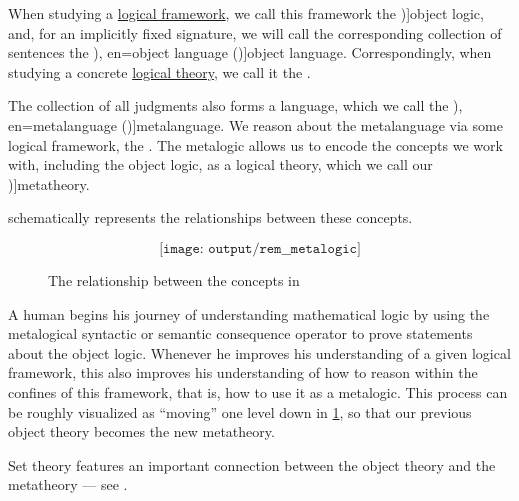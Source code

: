 \begin{concept}\label{con:metalogic}
  When studying a \hyperref[def:logical_framework]{logical framework}, we call this framework the \term[en=object logic (\cite[3]{Kleene2002Logic})]{object logic}, and, for an implicitly fixed signature, we will call the corresponding collection of sentences the \term[ru=предметный язык (\cite[35]{Герасимов2011}), en=object language (\cite[3]{Kleene2002Logic})]{object language}. Correspondingly, when studying a concrete \hyperref[def:logical_theory]{logical theory}, we call it the .

  The collection of all judgments also forms a language, which we call the \term[ru=метаязык (\cite[35]{Герасимов2011}), en=metalanguage (\cite[3]{Kleene2002Logic})]{metalanguage}. We reason about the metalanguage via some logical framework, the . The metalogic allows us to encode the concepts we work with, including the object logic, as a logical theory, which we call our \term[en=metatheory (\cite[199]{Kleene2002Logic})]{metatheory}.

   schematically represents the relationships between these concepts.

  \begin{figure}[!ht]
    \begin{equation*}
      \texttt{[image: output/rem\_\_metalogic]}
    \end{equation*}
    \caption{The relationship between the concepts in }\label{fig:con:metalogic}
  \end{figure}

  A human begins his journey of understanding mathematical logic by using the metalogical syntactic or semantic consequence operator to prove statements about the object logic. Whenever he improves his understanding of a given logical framework, this also improves his understanding of how to reason within the confines of this framework, that is, how to use it as a metalogic. This process can be roughly visualized as \enquote{moving} one level down in \cref{fig:con:metalogic}, so that our previous object theory becomes the new metatheory.
\end{concept}
\begin{comments}
  \item Set theory features an important connection between the object theory and the metatheory --- see .
\end{comments}

